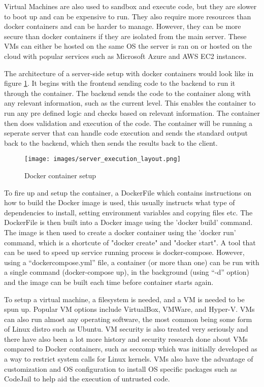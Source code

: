 Virtual Machines are also used to sandbox and execute code, but they are slower to boot up and can be expensive to run. They also require more resources than docker containers and can be harder to manage. However, they can be more secure than docker containers if they are isolated from the main server. These VMs can either be hosted on the same OS the server is ran on or hosted on the cloud with popular services such as Microsoft Azure and AWS EC2 instances.

The architecture of a server-side setup with docker containers would look like in figure \ref{fig:docker container setup}. It begins with the frontend sending code to the backend to run it through the container. The backend sends the code to the container along with any relevant information, such as the current level. This enables the container to run any pre defined logic and checks based on relevant information. The container then does validation and execution of the code. The container will be running a seperate server that can handle code execution and sends the standard output back to the backend, which then sends the results back to the client. 

\begin{figure}
    \centering
    \texttt{[image: images/server\_execution\_layout.png]}
    \caption{Docker container setup}
    \label{fig:docker container setup}
\end{figure}

To fire up and setup the container, a DockerFile which contains instructions on how to build the Docker image is used, this usually instructs what type of dependencies to install, setting environment variables and copying files etc. The DockerFile is then built into a Docker image using the 'docker build' command. The image is then used to create a docker container using the 'docker run' command, which is a shortcute of "docker create" and "docker start". A tool that can be used to speed up service running process is docker-compose. However, using a “dockercompose.yml” file, a container (or more than one) can be run with a single command (docker-compose up), in the background (using “-d” option) and the image can be built each time before container starts again.

To setup a virtual machine, a filesystem is needed, and a VM is needed to be spun up. Popular VM options include VirtualBox, VMWare, and Hyper-V. VMs can also run almost any operating software, the most common being some form of Linux distro such as Ubuntu. VM security is also treated very seriously and there have also been a lot more history and security research done about VMs compared to Docker containers, such as seccomp which was initially developed as a way to restrict system calls for Linux kernels. VMs also have the advantage of customization and OS configuration to install OS specific packages such as CodeJail to help aid the execution of untrusted code.

